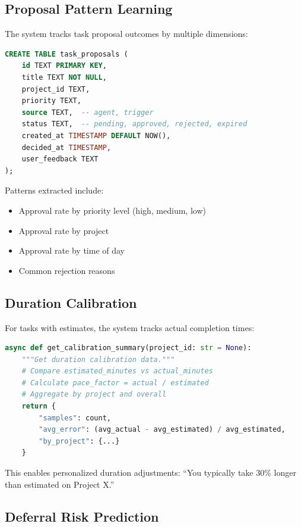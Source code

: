\documentclass[11pt,a4paper]{article}
\begin{document}
\subsection{Proposal Pattern Learning}

The system tracks task proposal outcomes by multiple dimensions:

\begin{lstlisting}[language=SQL]
CREATE TABLE task_proposals (
    id TEXT PRIMARY KEY,
    title TEXT NOT NULL,
    project_id TEXT,
    priority TEXT,
    source TEXT,  -- agent, trigger
    status TEXT,  -- pending, approved, rejected, expired
    created_at TIMESTAMP DEFAULT NOW(),
    decided_at TIMESTAMP,
    user_feedback TEXT
);
\end{lstlisting}

Patterns extracted include:
\begin{itemize}
    \item Approval rate by priority level (high, medium, low)
    \item Approval rate by project
    \item Approval rate by time of day
    \item Common rejection reasons
\end{itemize}

\subsection{Duration Calibration}

For tasks with estimates, the system tracks actual completion times:

\begin{lstlisting}[language=Python]
async def get_calibration_summary(project_id: str = None):
    """Get duration calibration data."""
    # Compare estimated_minutes vs actual_minutes
    # Calculate pace_factor = actual / estimated
    # Aggregate by project and overall
    return {
        "samples": count,
        "avg_error": (avg_actual - avg_estimated) / avg_estimated,
        "by_project": {...}
    }
\end{lstlisting}

This enables personalized duration adjustments: ``You typically take 30\% longer than estimated on Project X.''

\subsection{Deferral Risk Prediction}
\end{document}
